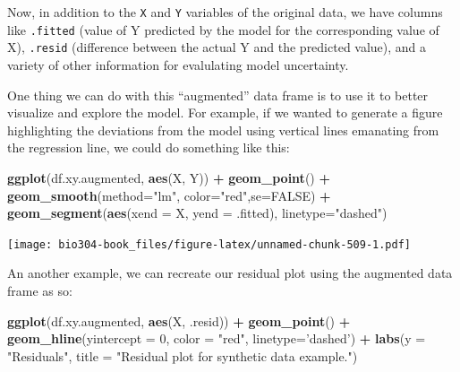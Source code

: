 \documentclass[]{book}
\newenvironment{Shaded}{\begin{snugshade}}{\end{snugshade}}
\newcommand{\DataTypeTok}[1]{\textcolor[rgb]{0.13,0.29,0.53}{#1}}
\newcommand{\DecValTok}[1]{\textcolor[rgb]{0.00,0.00,0.81}{#1}}
\newcommand{\KeywordTok}[1]{\textcolor[rgb]{0.13,0.29,0.53}{\textbf{#1}}}
\newcommand{\NormalTok}[1]{#1}
\newcommand{\OperatorTok}[1]{\textcolor[rgb]{0.81,0.36,0.00}{\textbf{#1}}}
\newcommand{\OtherTok}[1]{\textcolor[rgb]{0.56,0.35,0.01}{#1}}
\newcommand{\StringTok}[1]{\textcolor[rgb]{0.31,0.60,0.02}{#1}}
\theoremstyle{definition}
\theoremstyle{definition}
\theoremstyle{definition}
\theoremstyle{remark}
\begin{document}
Now, in addition to the \texttt{X} and \texttt{Y} variables of the
original data, we have columns like \texttt{.fitted} (value of Y
predicted by the model for the corresponding value of X),
\texttt{.resid} (difference between the actual Y and the predicted
value), and a variety of other information for evalulating model
uncertainty.

One thing we can do with this ``augmented'' data frame is to use it to
better visualize and explore the model. For example, if we wanted to
generate a figure highlighting the deviations from the model using
vertical lines emanating from the regression line, we could do something
like this:

\begin{Shaded}
\begin{Highlighting}[]
\KeywordTok{ggplot}\NormalTok{(df.xy.augmented, }\KeywordTok{aes}\NormalTok{(X, Y)) }\OperatorTok{+}\StringTok{ }
\StringTok{  }\KeywordTok{geom_point}\NormalTok{() }\OperatorTok{+}\StringTok{ }\KeywordTok{geom_smooth}\NormalTok{(}\DataTypeTok{method=}\StringTok{"lm"}\NormalTok{, }\DataTypeTok{color=}\StringTok{"red"}\NormalTok{,}\DataTypeTok{se=}\OtherTok{FALSE}\NormalTok{) }\OperatorTok{+}
\StringTok{  }\KeywordTok{geom_segment}\NormalTok{(}\KeywordTok{aes}\NormalTok{(}\DataTypeTok{xend =}\NormalTok{ X, }\DataTypeTok{yend =}\NormalTok{ .fitted), }\DataTypeTok{linetype=}\StringTok{"dashed"}\NormalTok{)}
\end{Highlighting}
\end{Shaded}

\texttt{[image: bio304-book\_files/figure-latex/unnamed-chunk-509-1.pdf]}

An another example, we can recreate our residual plot using the
augmented data frame as so:

\begin{Shaded}
\begin{Highlighting}[]
\KeywordTok{ggplot}\NormalTok{(df.xy.augmented, }\KeywordTok{aes}\NormalTok{(X, .resid)) }\OperatorTok{+}\StringTok{ }
\StringTok{  }\KeywordTok{geom_point}\NormalTok{() }\OperatorTok{+}\StringTok{ }
\StringTok{  }\KeywordTok{geom_hline}\NormalTok{(}\DataTypeTok{yintercept =} \DecValTok{0}\NormalTok{, }\DataTypeTok{color =} \StringTok{"red"}\NormalTok{, }\DataTypeTok{linetype=}\StringTok{'dashed'}\NormalTok{) }\OperatorTok{+}\StringTok{ }
\StringTok{  }\KeywordTok{labs}\NormalTok{(}\DataTypeTok{y =} \StringTok{"Residuals"}\NormalTok{, }\DataTypeTok{title =} \StringTok{"Residual plot for synthetic data example."}\NormalTok{)}
\end{Highlighting}
\end{Shaded}
\end{document}
